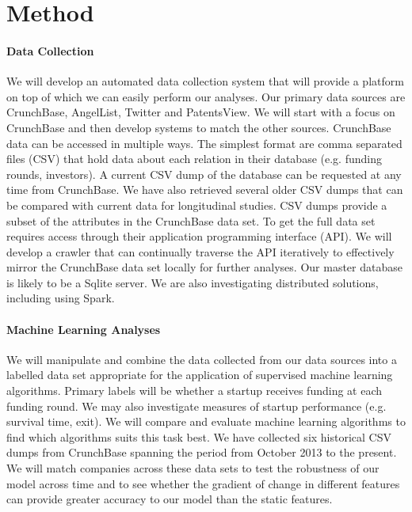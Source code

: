 \documentclass[../thesis/thesis.tex]{subfiles}
\begin{document}
\section*{Method}

\paragraph{Data Collection}

We will develop an automated data collection system that will provide a platform on top of which we can easily perform our analyses. Our primary data sources are CrunchBase, AngelList, Twitter and PatentsView. We will start with a focus on CrunchBase and then develop systems to match the other sources. CrunchBase data can be accessed in multiple ways. The simplest format are comma separated files (CSV) that hold data about each relation in their database (e.g. funding rounds, investors). A current CSV dump of the database can be requested at any time from CrunchBase. We have also retrieved several older CSV dumps that can be compared with current data for longitudinal studies. CSV dumps provide a subset of the attributes in the CrunchBase data set. To get the full data set requires access through their application programming interface (API). We will develop a crawler that can continually traverse the API iteratively to effectively mirror the CrunchBase data set locally for further analyses. Our master database is likely to be a Sqlite server. We are also investigating distributed solutions, including using Spark.

\paragraph{Machine Learning Analyses}

We will manipulate and combine the data collected from our data sources into a labelled data set appropriate for the application of supervised machine learning algorithms. Primary labels will be whether a startup receives funding at each funding round. We may also investigate measures of startup performance (e.g. survival time, exit). We will compare and evaluate machine learning algorithms to find which algorithms suits this task best. We have collected six historical CSV dumps from CrunchBase spanning the period from October 2013 to the present. We will match companies across these data sets to test the robustness of our model across time and to see whether the gradient of change in different features can provide greater accuracy to our model than the static features.
\end{document}
